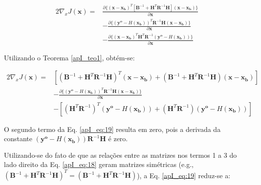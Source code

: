 \begin{equation}
  \label{apI_eq:18}
  \begin{aligned}
    2\nabla_{x}{J(\mathbf{x})} = {} & \frac{\partial \lbrace(\mathbf{x} - \mathbf{x_{b}})^{T}[\mathbf{B}^{-1} + \mathbf{H}^{T}\mathbf{R}^{-1}\mathbf{H}](\mathbf{x} - \mathbf{x_{b}})\rbrace}{\partial \mathbf{x}} \\
                & - \frac{\partial \lbrace(\mathbf{y^{o}} - \textit{H}(\mathbf{x_{b}}))^{T}\mathbf{R}^{-1}\mathbf{H}(\mathbf{x} - \mathbf{x_{b}})\rbrace}{\partial \mathbf{x}} \\ 
                & - \frac{\partial \lbrace(\mathbf{x} - \mathbf{x_{b}})^{T}\mathbf{H}^{T}\mathbf{R}^{-1}(\mathbf{y^{o}} - \textit{H}(\mathbf{x_{b}}))\rbrace}{\partial \mathbf{x}}
  \end{aligned}  
\end{equation}

Utilizando o Teorema \ref{apI_teo1}, obtém-se:

\begin{equation}
  \label{apI_eq:19}
  \begin{aligned}
    2\nabla_{x}{J(\mathbf{x})} = {} & [(\mathbf{B}^{-1} + \mathbf{H}^{T}\mathbf{R}^{-1}\mathbf{H})^{T}(\mathbf{x} - \mathbf{x_{b}}) + (\mathbf{B}^{-1} + \mathbf{H}^{T}\mathbf{R}^{-1}\mathbf{H})(\mathbf{x} - \mathbf{x_{b}})] \\
                & - \frac{\partial \lbrace(\mathbf{y^{o}} - \textit{H}(\mathbf{x_{b}}))^{T}\mathbf{R}^{-1}\mathbf{H}(\mathbf{x} - \mathbf{x_{b}})\rbrace}{\partial \mathbf{x}} \\ 
                & - [(\mathbf{H}^{T}\mathbf{R}^{-1})^{T}(\mathbf{y^{o}} - \textit{H}(\mathbf{x_{b}})) + (\mathbf{H}^{T}\mathbf{R}^{-1})(\mathbf{y^{o}} - \textit{H}(\mathbf{x_{b}}))]
  \end{aligned}  
\end{equation}

O segundo termo da Eq. \ref{apI_eq:19} resulta em zero, pois a derivada da constante $(\mathbf{y^{o}} - \textit{H}(\mathbf{x_{b}}))\mathbf{R}^{-1}\mathbf{H}$ é zero.

Utilizando-se do fato de que as relações entre as matrizes nos termos 1 a 3 do lado direito da Eq. \ref{apI_eq:18} geram matrizes simétricas (e.g., $(\mathbf{B}^{-1} + \mathbf{H}^{T}\mathbf{R}^{-1}\mathbf{H})^{T}= (\mathbf{B}^{-1} + \mathbf{H}^{T}\mathbf{R}^{-1}\mathbf{H})$), a Eq. \ref{apI_eq:19} reduz-se a:


